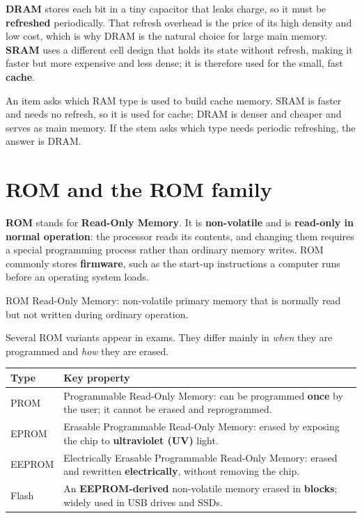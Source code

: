 \textbf{DRAM} stores each bit in a tiny capacitor that leaks charge, so it
must be \textbf{refreshed} periodically. That refresh overhead is the price
of its high density and low cost, which is why DRAM is the natural choice
for large main memory. \textbf{SRAM} uses a different cell design that holds
its state without refresh, making it faster but more expensive and less
dense; it is therefore used for the small, fast \textbf{cache}.

\begin{example}
An item asks which RAM type is used to build cache memory. SRAM is faster
and needs no refresh, so it is used for cache; DRAM is denser and cheaper
and serves as main memory. If the stem asks which type needs periodic
refreshing, the answer is DRAM.
\end{example}

\section{ROM and the ROM family}
\textbf{ROM} stands for \textbf{Read-Only Memory}. It is \textbf{non-volatile}
and is \textbf{read-only in normal operation}: the processor reads its
contents, and changing them requires a special programming process rather
than ordinary memory writes. ROM commonly stores \textbf{firmware}, such as
the start-up instructions a computer runs before an operating system loads.

\begin{definitionbox}{ROM}
Read-Only Memory: non-volatile primary memory that is normally read but not
written during ordinary operation.
\end{definitionbox}

Several ROM variants appear in exams. They differ mainly in \emph{when} they
are programmed and \emph{how} they are erased.

\begin{center}
\begin{tabular}{p{}p{}}
\toprule
\textbf{Type} & \textbf{Key property}\\
\midrule
PROM & Programmable Read-Only Memory: can be programmed \textbf{once} by the user; it cannot be erased and reprogrammed.\\
EPROM & Erasable Programmable Read-Only Memory: erased by exposing the chip to \textbf{ultraviolet (UV)} light.\\
EEPROM & Electrically Erasable Programmable Read-Only Memory: erased and rewritten \textbf{electrically}, without removing the chip.\\
Flash & An \textbf{EEPROM-derived} non-volatile memory erased in \textbf{blocks}; widely used in USB drives and SSDs.\\
\bottomrule
\end{tabular}
\end{center}

